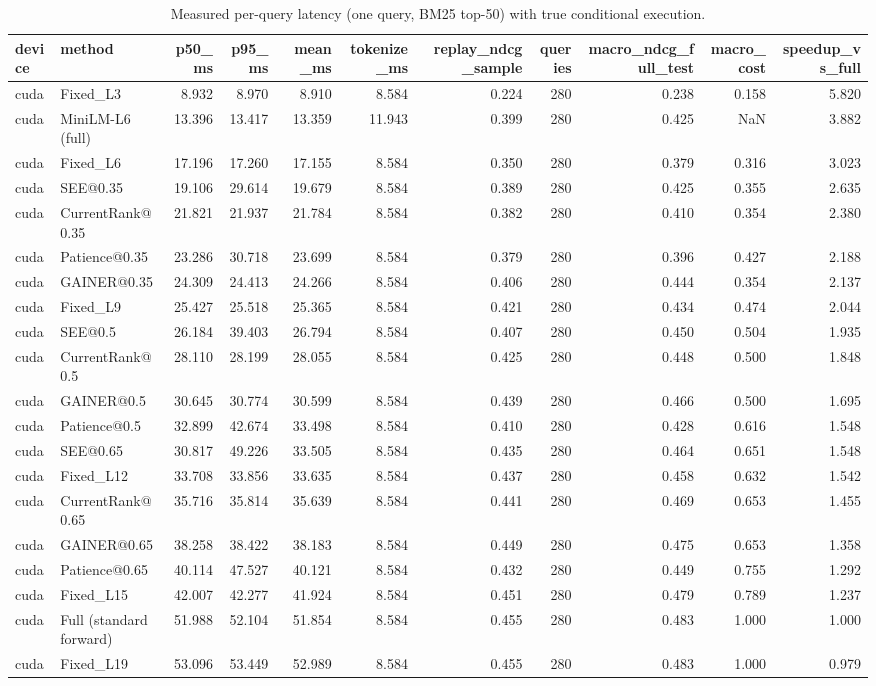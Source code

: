 \begin{table}
\caption{Measured per-query latency (one query, BM25 top-50) with true conditional execution.}
\label{tab:latency}
\begin{tabular}{llrrrrrrrrr}
\toprule
device & method & p50_ms & p95_ms & mean_ms & tokenize_ms & replay_ndcg_sample & queries & macro_ndcg_full_test & macro_cost & speedup_vs_full \\
\midrule
cuda & Fixed_L3 & 8.932 & 8.970 & 8.910 & 8.584 & 0.224 & 280 & 0.238 & 0.158 & 5.820 \\
cuda & MiniLM-L6 (full) & 13.396 & 13.417 & 13.359 & 11.943 & 0.399 & 280 & 0.425 & NaN & 3.882 \\
cuda & Fixed_L6 & 17.196 & 17.260 & 17.155 & 8.584 & 0.350 & 280 & 0.379 & 0.316 & 3.023 \\
cuda & SEE@0.35 & 19.106 & 29.614 & 19.679 & 8.584 & 0.389 & 280 & 0.425 & 0.355 & 2.635 \\
cuda & CurrentRank@0.35 & 21.821 & 21.937 & 21.784 & 8.584 & 0.382 & 280 & 0.410 & 0.354 & 2.380 \\
cuda & Patience@0.35 & 23.286 & 30.718 & 23.699 & 8.584 & 0.379 & 280 & 0.396 & 0.427 & 2.188 \\
cuda & GAINER@0.35 & 24.309 & 24.413 & 24.266 & 8.584 & 0.406 & 280 & 0.444 & 0.354 & 2.137 \\
cuda & Fixed_L9 & 25.427 & 25.518 & 25.365 & 8.584 & 0.421 & 280 & 0.434 & 0.474 & 2.044 \\
cuda & SEE@0.5 & 26.184 & 39.403 & 26.794 & 8.584 & 0.407 & 280 & 0.450 & 0.504 & 1.935 \\
cuda & CurrentRank@0.5 & 28.110 & 28.199 & 28.055 & 8.584 & 0.425 & 280 & 0.448 & 0.500 & 1.848 \\
cuda & GAINER@0.5 & 30.645 & 30.774 & 30.599 & 8.584 & 0.439 & 280 & 0.466 & 0.500 & 1.695 \\
cuda & Patience@0.5 & 32.899 & 42.674 & 33.498 & 8.584 & 0.410 & 280 & 0.428 & 0.616 & 1.548 \\
cuda & SEE@0.65 & 30.817 & 49.226 & 33.505 & 8.584 & 0.435 & 280 & 0.464 & 0.651 & 1.548 \\
cuda & Fixed_L12 & 33.708 & 33.856 & 33.635 & 8.584 & 0.437 & 280 & 0.458 & 0.632 & 1.542 \\
cuda & CurrentRank@0.65 & 35.716 & 35.814 & 35.639 & 8.584 & 0.441 & 280 & 0.469 & 0.653 & 1.455 \\
cuda & GAINER@0.65 & 38.258 & 38.422 & 38.183 & 8.584 & 0.449 & 280 & 0.475 & 0.653 & 1.358 \\
cuda & Patience@0.65 & 40.114 & 47.527 & 40.121 & 8.584 & 0.432 & 280 & 0.449 & 0.755 & 1.292 \\
cuda & Fixed_L15 & 42.007 & 42.277 & 41.924 & 8.584 & 0.451 & 280 & 0.479 & 0.789 & 1.237 \\
cuda & Full (standard forward) & 51.988 & 52.104 & 51.854 & 8.584 & 0.455 & 280 & 0.483 & 1.000 & 1.000 \\
cuda & Fixed_L19 & 53.096 & 53.449 & 52.989 & 8.584 & 0.455 & 280 & 0.483 & 1.000 & 0.979 \\
\bottomrule
\end{tabular}
\end{table}
